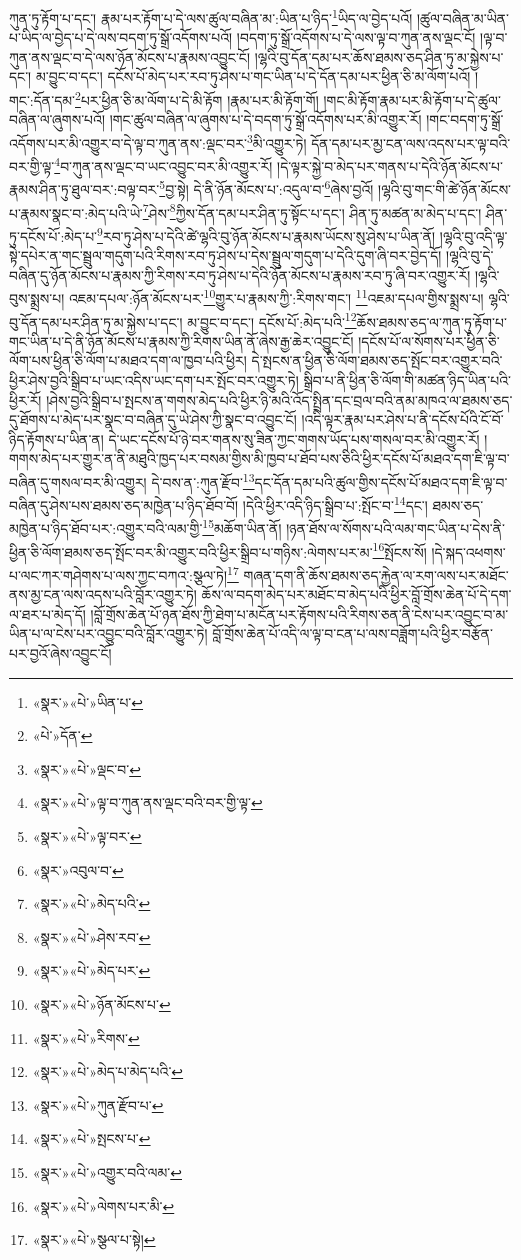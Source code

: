 ཀུན་ཏུ་རྟོག་པ་དང་། རྣམ་པར་རྟོག་པ་དེ་ལས་ཚུལ་བཞིན་མ་:ཡིན་པ་ཉིད་\footnote{«སྣར་»«པེ་»ཡིན་པ་}ཡིད་ལ་བྱེད་པའོ། །ཚུལ་བཞིན་མ་ཡིན་པ་ཡིད་ལ་བྱེད་པ་དེ་ལས་བདག་ཏུ་སྒྲོ་འདོགས་པའོ། །བདག་ཏུ་སྒྲོ་འདོགས་པ་དེ་ལས་ལྟ་བ་ཀུན་ནས་ལྡང་ངོ། །ལྟ་བ་ཀུན་ནས་ལྡང་བ་དེ་ལས་ཉོན་མོངས་པ་རྣམས་འབྱུང་ངོ། །ལྷའི་བུ་དོན་དམ་པར་ཆོས་ཐམས་ཅད་ཤིན་ཏུ་མ་སྐྱེས་པ་དང་། མ་བྱུང་བ་དང་། དངོས་པོ་མེད་པར་རབ་ཏུ་ཤེས་པ་གང་ཡིན་པ་དེ་དོན་དམ་པར་ཕྱིན་ཅི་མ་ལོག་པའོ། །གང་:དོན་དམ་\footnote{«པེ་»དོན་}པར་ཕྱིན་ཅི་མ་ལོག་པ་དེ་མི་རྟོག །རྣམ་པར་མི་རྟོག་གོ། །གང་མི་རྟོག་རྣམ་པར་མི་རྟོག་པ་དེ་ཚུལ་བཞིན་ལ་ཞུགས་པའོ། །གང་ཚུལ་བཞིན་ལ་ཞུགས་པ་དེ་བདག་ཏུ་སྒྲོ་འདོགས་པར་མི་འགྱུར་རོ། །གང་བདག་ཏུ་སྒྲོ་འདོགས་པར་མི་འགྱུར་བ་དེ་ལྟ་བ་ཀུན་ནས་:ལྡང་བར་\footnote{«སྣར་»«པེ་»ལྡང་བ་}མི་འགྱུར་ཏེ། དོན་དམ་པར་མྱ་ངན་ལས་འདས་པར་ལྟ་བའི་བར་གྱི་ལྟ་\footnote{«སྣར་»«པེ་»ལྟ་བ་ཀུན་ནས་ལྡང་བའི་བར་གྱི་ལྟ་}བ་ཀུན་ནས་ལྡང་བ་ཡང་འབྱུང་བར་མི་འགྱུར་རོ། །དེ་ལྟར་སྐྱེ་བ་མེད་པར་གནས་པ་དེའི་ཉོན་མོངས་པ་རྣམས་ཤིན་ཏུ་ཐུལ་བར་:བལྟ་བར་\footnote{«སྣར་»«པེ་»ལྟ་བར་}བྱ་སྟེ། དེ་ནི་ཉོན་མོངས་པ་:འདུལ་བ་\footnote{«སྣར་»འབུལ་བ་}ཞེས་བྱའོ། །ལྷའི་བུ་གང་གི་ཚེ་ཉོན་མོངས་པ་རྣམས་སྣང་བ་:མེད་པའི་ཡེ་\footnote{«སྣར་»«པེ་»མེད་པའི་}ཤེས་\footnote{«སྣར་»«པེ་»ཤེས་རབ་}ཀྱིས་དོན་དམ་པར་ཤིན་ཏུ་སྟོང་པ་དང་། ཤིན་ཏུ་མཚན་མ་མེད་པ་དང་། ཤིན་ཏུ་དངོས་པོ་:མེད་པ་\footnote{«སྣར་»«པེ་»མེད་པར་}རབ་ཏུ་ཤེས་པ་དེའི་ཚེ་ལྷའི་བུ་ཉོན་མོངས་པ་རྣམས་ཡོངས་སུ་ཤེས་པ་ཡིན་ནོ། །ལྷའི་བུ་འདི་ལྟ་སྟེ་དཔེར་ན་གང་སྦྲུལ་གདུག་པའི་རིགས་རབ་ཏུ་ཤེས་པ་དེས་སྦྲུལ་གདུག་པ་དེའི་དུག་ཞི་བར་བྱེད་དོ། །ལྷའི་བུ་དེ་བཞིན་དུ་ཉོན་མོངས་པ་རྣམས་ཀྱི་རིགས་རབ་ཏུ་ཤེས་པ་དེའི་ཉོན་མོངས་པ་རྣམས་རབ་ཏུ་ཞི་བར་འགྱུར་རོ། །ལྷའི་བུས་སྨྲས་པ། འཇམ་དཔལ་:ཉོན་མོངས་པར་\footnote{«སྣར་»«པེ་»ཉོན་མོངས་པ་}གྱུར་པ་རྣམས་ཀྱི་:རིགས་གང་། \footnote{«སྣར་»«པེ་»རིགས་}འཇམ་དཔལ་གྱིས་སྨྲས་པ། ལྷའི་བུ་དོན་དམ་པར་ཤིན་ཏུ་མ་སྐྱེས་པ་དང་། མ་བྱུང་བ་དང་། དངོས་པོ་:མེད་པའི་\footnote{«སྣར་»«པེ་»མེད་པ་མེད་པའི་}ཆོས་ཐམས་ཅད་ལ་ཀུན་ཏུ་རྟོག་པ་གང་ཡིན་པ་དེ་ནི་ཉོན་མོངས་པ་རྣམས་ཀྱི་རིགས་ཡིན་ནོ་ཞེས་རྒྱ་ཆེར་འབྱུང་ངོ། །དངོས་པོ་ལ་སོགས་པར་ཕྱིན་ཅི་ལོག་པས་ཕྱིན་ཅི་ལོག་པ་མཐའ་དག་ལ་ཁྱབ་པའི་ཕྱིར། དེ་སྤངས་ན་ཕྱིན་ཅི་ལོག་ཐམས་ཅད་སྤོང་བར་འགྱུར་བའི་ཕྱིར་ཤེས་བྱའི་སྒྲིབ་པ་ཡང་འདིས་ཡང་དག་པར་སྤོང་བར་འགྱུར་ཏེ། སྒྲིབ་པ་ནི་ཕྱིན་ཅི་ལོག་གི་མཚན་ཉིད་ཡིན་པའི་ཕྱིར་རོ། །ཤེས་བྱའི་སྒྲིབ་པ་སྤངས་ན་གགས་མེད་པའི་ཕྱིར་ཉི་མའི་འོད་སྤྲིན་དང་བྲལ་བའི་ནམ་མཁའ་ལ་ཐམས་ཅད་དུ་ཐོགས་པ་མེད་པར་སྣང་བ་བཞིན་དུ་ཡེ་ཤེས་ཀྱི་སྣང་བ་འབྱུང་ངོ། །འདི་ལྟར་རྣམ་པར་ཤེས་པ་ནི་དངོས་པོའི་ངོ་བོ་ཉིད་རྟོགས་པ་ཡིན་ན། དེ་ཡང་དངོས་པོ་ཉེ་བར་གནས་སུ་ཟིན་ཀྱང་གགས་ཡོད་པས་གསལ་བར་མི་འགྱུར་རོ། །གགས་མེད་པར་གྱུར་ན་ནི་མཐུའི་ཁྱད་པར་བསམ་གྱིས་མི་ཁྱབ་པ་ཐོབ་པས་ཅིའི་ཕྱིར་དངོས་པོ་མཐའ་དག་ཇི་ལྟ་བ་བཞིན་དུ་གསལ་བར་མི་འགྱུར། དེ་བས་ན་:ཀུན་རྫོབ་\footnote{«སྣར་»«པེ་»ཀུན་རྫོབ་པ་}དང་དོན་དམ་པའི་ཚུལ་གྱིས་དངོས་པོ་མཐའ་དག་ཇི་ལྟ་བ་བཞིན་དུ་ཤེས་པས་ཐམས་ཅད་མཁྱེན་པ་ཉིད་ཐོབ་བོ། །དེའི་ཕྱིར་འདི་ཉིད་སྒྲིབ་པ་:སྤོང་བ་\footnote{«སྣར་»«པེ་»སྤངས་པ་}དང་། ཐམས་ཅད་མཁྱེན་པ་ཉིད་ཐོབ་པར་:འགྱུར་བའི་ལམ་གྱི་\footnote{«སྣར་»«པེ་»འགྱུར་བའི་ལམ་}མཆོག་ཡིན་ནོ། །ཉན་ཐོས་ལ་སོགས་པའི་ལམ་གང་ཡིན་པ་དེས་ནི་ཕྱིན་ཅི་ལོག་ཐམས་ཅད་སྤོང་བར་མི་འགྱུར་བའི་ཕྱིར་སྒྲིབ་པ་གཉིས་:ལེགས་པར་མ་\footnote{«སྣར་»«པེ་»ལེགས་པར་མི་}སྤོངས་སོ། །དེ་སྐད་འཕགས་པ་ལང་ཀར་གཤེགས་པ་ལས་ཀྱང་བཀའ་:སྩལ་ཏེ།\footnote{«སྣར་»«པེ་»སྩལ་པ་སྟེ།} གཞན་དག་ནི་ཆོས་ཐམས་ཅད་རྐྱེན་ལ་རག་ལས་པར་མཐོང་ནས་མྱ་ངན་ལས་འདས་པའི་བློར་འགྱུར་ཏེ། ཆོས་ལ་བདག་མེད་པར་མཐོང་བ་མེད་པའི་ཕྱིར་བློ་གྲོས་ཆེན་པོ་དེ་དག་ལ་ཐར་པ་མེད་དོ། །བློ་གྲོས་ཆེན་པོ་ཉན་ཐོས་ཀྱི་ཐེག་པ་མངོན་པར་རྟོགས་པའི་རིགས་ཅན་ནི་ངེས་པར་འབྱུང་བ་མ་ཡིན་པ་ལ་ངེས་པར་འབྱུང་བའི་བློར་འགྱུར་ཏེ། བློ་གྲོས་ཆེན་པོ་འདི་ལ་ལྟ་བ་ངན་པ་ལས་བཟློག་པའི་ཕྱིར་བརྩོན་པར་བྱའོ་ཞེས་འབྱུང་ངོ། 